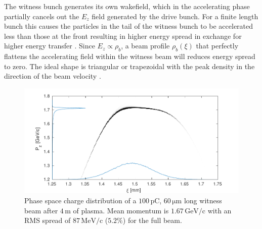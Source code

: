 \documentclass[aps,prstab,reprint,amsmath,amssymb,groupedaddress]{revtex4-1}
\newcommand{\unit}[1]{\,\mathrm{#1}}
\begin{document}
The witness bunch generates its own wakefield, which in the accelerating phase partially cancels out the $E_{z}$ field
generated by the drive bunch. For a finite length bunch this causes the particles in the tail of the witness bunch to be
accelerated less than those at the front resulting in higher energy spread in exchange for higher energy transfer
\cite{van_der_meer:1985}. Since $E_{z} \propto \rho_{b}$, a beam profile $\rho_{b}(\xi)$ that perfectly flattens the
accelerating field within the witness beam will reduces energy spread to zero. The ideal shape is triangular or
trapezoidal with the peak density in the direction of the beam velocity \cite{katsouleas:1987, tzoufras:2009}.


\begin{figure}[hbt]
    \includegraphics[width=\linewidth,trim={2mm 0mm 2mm 0mm},clip]{figures/beamPhaseSpace}
    \caption{\label{Fig:BeamPS} Phase space charge distribution of a $100\unit{pC}$, $60\unit{\mu m}$ long witness beam
        after $4\unit{m}$ of plasma. Mean momentum is $1.67\unit{GeV/c}$ with an RMS spread of $87\unit{MeV/c}$
        ($5.2\%$) for the full beam.}
\end{figure}
\end{document}
